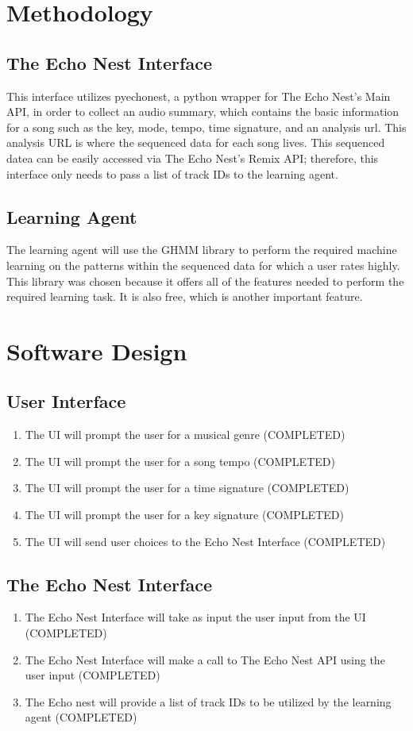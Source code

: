 \documentclass{article}
\begin{document}
\section{Methodology}
\subsection{The Echo Nest Interface}
This interface utilizes pyechonest, a python wrapper for The Echo Nest's Main API, in order to collect an 
audio summary, which contains the basic information for a song such as the key, mode, tempo, time signature, 
and an analysis url. This analysis URL is where the sequenced data for each song lives. This sequenced datea
can be easily accessed via The Echo Nest's Remix API; therefore, this interface only needs to pass a list of
track IDs to the learning agent.

\subsection{Learning Agent}
The learning agent will use the GHMM library \cite{GHMM} to perform the required machine learning on the 
patterns within the sequenced data for which a user rates highly. This library was chosen because it offers 
all of the features needed to perform the required learning task. It is also free, which is another important 
feature.

\section{Software Design}
\subsection{User Interface}
\begin{enumerate}
\item The UI will prompt the user for a musical genre (COMPLETED)
\item The UI will prompt the user for a song tempo (COMPLETED)
\item The UI will prompt the user for a time signature (COMPLETED)
\item The UI will prompt the user for a key signature (COMPLETED)
\item The UI will send user choices to the Echo Nest Interface (COMPLETED)
\end{enumerate}

\subsection{The Echo Nest Interface}
\begin{enumerate}
\item The Echo Nest Interface will take as input the user input from the UI (COMPLETED)
\item The Echo Nest Interface will make a call to The Echo Nest API using the user input (COMPLETED)
\item The Echo nest will provide a list of track IDs to be utilized by the learning agent (COMPLETED)
\end{enumerate}
\end{document}
